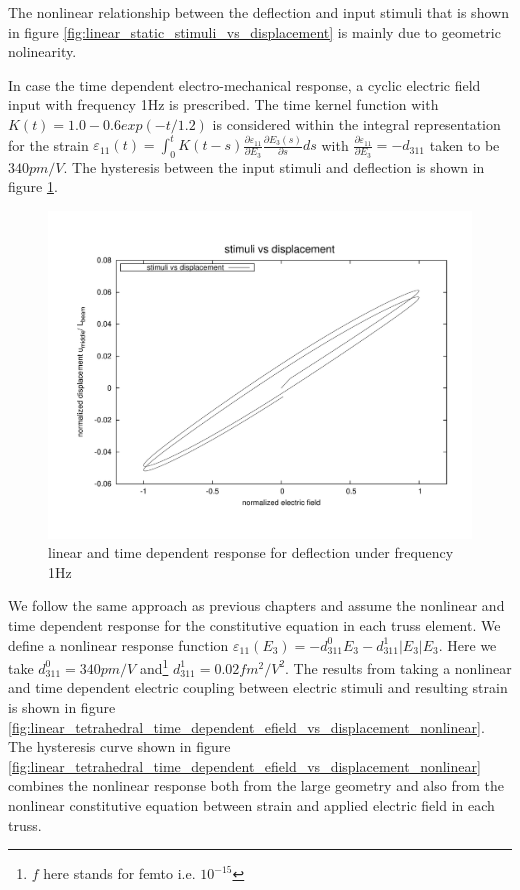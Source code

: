 The nonlinear relationship between the deflection and input stimuli that is shown in figure \ref {fig:linear_static_stimuli_vs_displacement} is mainly due to geometric nolinearity.

In case the time dependent electro-mechanical response, a cyclic electric field input with frequency 1Hz is prescribed.
The time kernel function with 
$K(t)=1.0-0.6 exp(-t/1.2)$ is considered within the integral representation for the strain 
$\varepsilon_{11}(t)=\int_0^t
K(t-s)\frac{\partial \varepsilon_{11}}{\partial E_3}\frac{\partial
E_3(s)}{\partial s} ds$ 
with 
$\frac{\partial \varepsilon_{11}}{\partial
E_3}=-d_{311}$ 
taken to be 
$340 pm/V$.
The hysteresis between the input stimuli and deflection is shown in figure \ref{fig:linear_tetrahedral_time_dependent_efield_vs_displacement}.

\begin{figure}  
\centering
\includegraphics[width=5.0in]{./chap_5_active_trusses/images_non_linear_time_dependent_constitutive_equatio/linear_tetrahedral_time_dependent_efield_vs_displacement.pdf}
\caption{linear and time dependent response for deflection under frequency 1Hz}
\label{fig:linear_tetrahedral_time_dependent_efield_vs_displacement}
\end{figure} 

We follow the same approach as previous chapters and assume the nonlinear and time dependent response for the constitutive equation in each truss element.
We define a nonlinear response function $\varepsilon_{11}(E_3)=-d_{311}^0 E_3-d_{311}^1 |E_3| E_3$.
Here we take $d_{311}^0=340pm/V$ and\footnote{$f$ here stands for femto i.e. $10^{-15}$ } $d_{311}^1=0.02 fm^2/V^2 $.
The results from taking a nonlinear and time dependent electric coupling between electric stimuli and resulting strain is shown in figure \ref{fig:linear_tetrahedral_time_dependent_efield_vs_displacement_nonlinear}.
The hysteresis curve shown in figure \ref{fig:linear_tetrahedral_time_dependent_efield_vs_displacement_nonlinear} combines the nonlinear response both from the large geometry and also from the nonlinear constitutive equation between strain and applied electric field in each truss.


